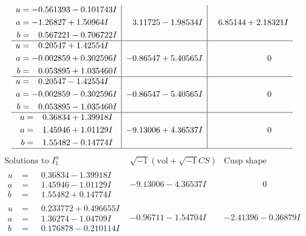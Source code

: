 \documentclass[1p]{elsarticle_modified}
\theoremstyle{definition}
\newcommand{\I}{\sqrt{-1}}
\begin{document}
$$\begin{array}{c|c|c}
\begin{aligned}
u &= -0.561393 - 0.101743 I \\
a &= -1.26827 + 1.50964 I \\
b &= \phantom{-}0.567221 - 0.706722 I\end{aligned}
 & \phantom{-}3.11725 - 1.98534 I & \phantom{-}6.85144 + 2.18321 I \\ \hline\begin{aligned}
u &= \phantom{-}0.20547 + 1.42554 I \\
a &= -0.002859 + 0.302596 I \\
b &= \phantom{-}0.053895 + 1.035460 I\end{aligned}
 & -0.86547 + 5.40565 I & \phantom{-0.000000 } 0 \\ \hline\begin{aligned}
u &= \phantom{-}0.20547 - 1.42554 I \\
a &= -0.002859 - 0.302596 I \\
b &= \phantom{-}0.053895 - 1.035460 I\end{aligned}
 & -0.86547 - 5.40565 I & \phantom{-0.000000 } 0 \\ \hline\begin{aligned}
u &= \phantom{-}0.36834 + 1.39918 I \\
a &= \phantom{-}1.45946 + 1.01129 I \\
b &= \phantom{-}1.55482 - 0.14774 I\end{aligned}
 & -9.13006 + 4.36537 I & \phantom{-0.000000 } 0\\
 \hline 
 \end{array}$$\newpage$$\begin{array}{c|c|c}  
\text{Solutions to }I^u_{1}& \I (\text{vol} + \sqrt{-1}CS) & \text{Cusp shape}\\
 \hline 
\begin{aligned}
u &= \phantom{-}0.36834 - 1.39918 I \\
a &= \phantom{-}1.45946 - 1.01129 I \\
b &= \phantom{-}1.55482 + 0.14774 I\end{aligned}
 & -9.13006 - 4.36537 I & \phantom{-0.000000 } 0 \\ \hline\begin{aligned}
u &= \phantom{-}0.233772 + 0.496655 I \\
a &= \phantom{-}1.36274 - 1.04709 I \\
b &= \phantom{-}0.176878 - 0.210114 I\end{aligned}
 & -0.96711 - 1.54704 I & -2.41396 - 0.36879 I \\ \hline\begin{aligned}

\end{aligned}
\end{array}$$
\end{document}
